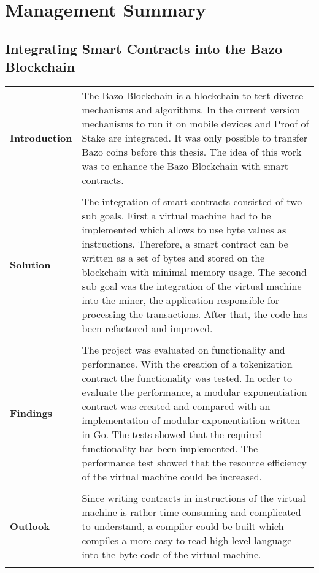 \chapter*{Management Summary}
\thispagestyle{main} %

\section*{Integrating Smart Contracts into the Bazo Blockchain}

\begin{tabular}[t]{ p{3cm} p{12.5cm}}
\textbf{Introduction} & 
The Bazo Blockchain is a blockchain to test diverse mechanisms and algorithms. In the current version mechanisms to run it on mobile devices and Proof of Stake are integrated. It was only possible to transfer Bazo coins before this thesis. The idea of this work was to enhance the Bazo Blockchain with smart contracts. \\ \\

\raggedright
\textbf{Solution} & 
The integration of smart contracts consisted of two sub goals. First a virtual machine had to be implemented which allows to use byte values as instructions. Therefore, a smart contract can be written as a set of bytes and stored on the blockchain with minimal memory usage. The second sub goal was the integration of the virtual machine into the miner, the application responsible for processing the transactions. After that, the code has been refactored and improved. \\ \\

\raggedright
\textbf{Findings} & 
The project was evaluated on functionality and performance. With the creation of a tokenization contract the functionality was tested. In order to evaluate the performance, a modular exponentiation contract was created and compared with an implementation of modular exponentiation written in Go. The tests showed that the required functionality has been implemented. The performance test showed that the resource efficiency of the virtual machine could be increased. \\ \\

\textbf{Outlook} &
Since writing contracts in instructions of the virtual machine is rather time consuming and complicated to understand, a compiler could be built which compiles a more easy to read high level language into the byte code of the virtual machine.
\\ \\
\end{tabular}
